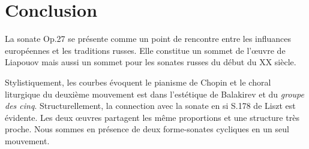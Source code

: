 \section{Conclusion}

La sonate Op.27 se présente comme un point de rencontre entre les influances européennes et les traditions russes. Elle constitue un sommet de l'œuvre de Liapouov mais aussi un sommet pour les sonates russes du début du XX\ieme{} siècle.

Stylistiquement, les courbes évoquent le pianisme de Chopin et le choral liturgique du deuxième mouvement est dans l'estétique de Balakirev et du \emph{groupe des cinq}. Structurellement, la connection avec la sonate en si S.178 de Liszt est évidente. Les deux œuvres partagent les même proportions et une structure très proche. Nous sommes en présence de deux forme-sonates cycliques en un seul mouvement.

